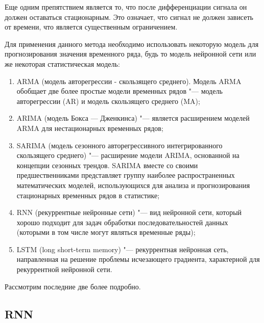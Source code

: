 \documentclass[bachelor, och, referat]{../shiza}
\begin{document}
        Еще одним препятствием является то, что после дифференциации сигнала он
        должен оставаться стационарным. Это означает, что сигнал не должен
        зависеть от времени, что является существенным ограничением.

        Для применения данного метода необходимо использовать некоторую модель
        для прогнозирования значения временного ряда, будь то модель нейронной
        сети или же некоторая статистическая модель:

        \begin{enumerate}
            \item ARMA (модель авторегрессии - скользящего среднего). Модель
            ARMA обобщает две более простые модели временных рядов "--- модель
            авторегрессии (AR) и модель скользящего среднего (MA);
            \item ARIMA (модель Бокса — Дженкинса) "--- является расширением
            моделей ARMA для нестационарных временных рядов;
            \item SARIMA (модель сезонного авторегрессивного интегрированного
            скользящего среднего) "--- расширение модели ARIMA, основанной на
            концепции сезонных трендов. SARIMA вместе со своими
            предшественниками представляет группу наиболее распространенных
            математических моделей, использующихся для анализа и прогнозирования
            стационарных временных рядов в статистике;
            \item RNN (рекуррентные нейронные сети) "--- вид нейронной сети,
            который хорошо подходит для задач обработки последовательностей
            данных (которыми в том числе могут являться временные ряды);
            \item LSTM (long short-term memory) "--- рекуррентная нейронная
            сеть, направленная на решение проблемы исчезающего градиента,
            характерной для рекуррентной нейронной сети.
        \end{enumerate}

        Рассмотрим последние две более подробно.

        \subsection{RNN}
\end{document}
